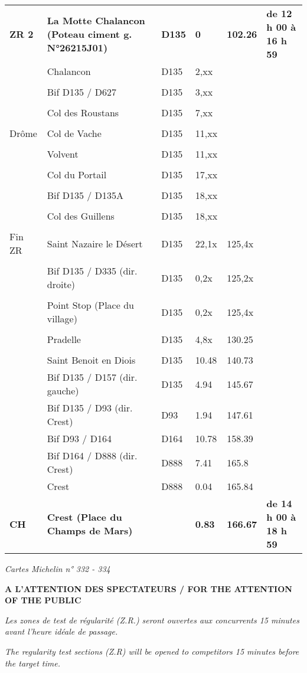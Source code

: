 \documentclass{article}%
\begin{document}
\begin{longtable}{p{2.25cm}|p{7.0cm}|p{1.5cm}|p{1.5cm}|p{1.5cm}|p{3.5cm}}
\textbf{ ZR 2      }&\textbf{La Motte Chalancon (Poteau ciment g. N°26215J01)}&\textbf{D135}&\textbf{0}&\textbf{102.26}&\textbf{de 12 h 00 à 16 h 59}\\%
 &Chalancon&D135&2,xx& & \\%
 & & & & & \\%
 &Bif D135 / D627&D135&3,xx& & \\%
 & & & & & \\%
 &Col des Roustans&D135&7,xx& & \\%
 & & & & & \\%
Drôme&Col de Vache&D135&11,xx& & \\%
 & & & & & \\%
 &Volvent&D135&11,xx& & \\%
 & & & & & \\%
 &Col du Portail&D135&17,xx& & \\%
 & & & & & \\%
 &Bif D135 / D135A&D135&18,xx& & \\%
 & & & & & \\%
 &Col des Guillens&D135&18,xx& & \\%
 & & & & & \\%
Fin ZR&Saint Nazaire le Désert&D135&22,1x&125,4x& \\%
 & & & & & \\%
 &Bif D135 / D335 (dir. droite)&D135&0,2x&125,2x& \\%
 & & & & & \\%
 &Point Stop (Place du village)&D135&0,2x&125,4x& \\%
 & & & & & \\%
 &Pradelle&D135&4,8x&130.25& \\%
 & & & & & \\%
 &Saint Benoit en Diois&D135&10.48&140.73& \\%
 &Bif D135 / D157 (dir. gauche)&D135&4.94&145.67& \\%
 &Bif D135 / D93 (dir. Crest)&D93&1.94&147.61& \\%
 &Bif D93 / D164&D164&10.78&158.39& \\%
 &Bif D164 / D888 (dir. Crest)&D888&7.41&165.8& \\%
 &Crest &D888&0.04&165.84& \\%
\textbf{CH}&\textbf{Crest (Place du Champs de Mars)}& &\textbf{0.83}&\textbf{166.67}&\textbf{de 14 h 00 à 18 h 59}\\%
\hline%
\end{longtable}%
\begin{flushleft} \textit{Cartes Michelin n° 332 - 334
} \end{flushleft}%
\begin{center} \textbf{A L’ATTENTION DES SPECTATEURS / FOR THE ATTENTION OF THE PUBLIC} \end{center}%
\begin{center} \textit{Les zones de test de régularité (Z.R.) seront ouvertes aux concurrents 15 minutes avant l’heure idéale de passage.} \end{center}%
\begin{center} \textit{The regularity test sections (Z.R) will be opened to competitors 15 minutes before the target time.} \end{center}%
\end{document}
